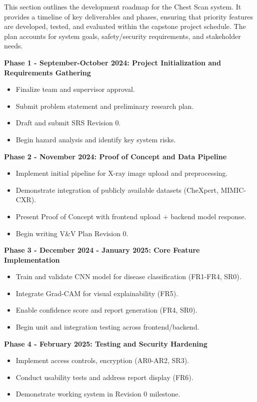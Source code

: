 \documentclass{article}
\begin{document}
This section outlines the development roadmap for the Chest Scan system. It provides a timeline of key deliverables and phases, ensuring that priority features are developed, tested, and evaluated within the capstone project schedule. The plan accounts for system goals, safety/security requirements, and stakeholder needs.

\textbf{Phase 1 - September-October 2024: Project Initialization and Requirements Gathering}
\begin{itemize}
  \item Finalize team and supervisor approval.
  \item Submit problem statement and preliminary research plan.
  \item Draft and submit SRS Revision 0.
  \item Begin hazard analysis and identify key system risks.
\end{itemize}

\textbf{Phase 2 - November 2024: Proof of Concept and Data Pipeline}
\begin{itemize}
  \item Implement initial pipeline for X-ray image upload and preprocessing.
  \item Demonstrate integration of publicly available datasets (CheXpert, MIMIC-CXR).
  \item Present Proof of Concept with frontend upload + backend model response.
  \item Begin writing V\&V Plan Revision 0.
\end{itemize}

\textbf{Phase 3 - December 2024 - January 2025: Core Feature Implementation}
\begin{itemize}
  \item Train and validate CNN model for disease classification (FR1-FR4, SR0).
  \item Integrate Grad-CAM for visual explainability (FR5).
  \item Enable confidence score and report generation (FR4, SR0).
  \item Begin unit and integration testing across frontend/backend.
\end{itemize}

\textbf{Phase 4 - February 2025: Testing and Security Hardening}
\begin{itemize}
  \item Implement access controls, encryption (AR0-AR2, SR3).
  \item Conduct usability tests and address report display (FR6).
  \item Demonstrate working system in Revision 0 milestone.
\end{itemize}
\end{document}
